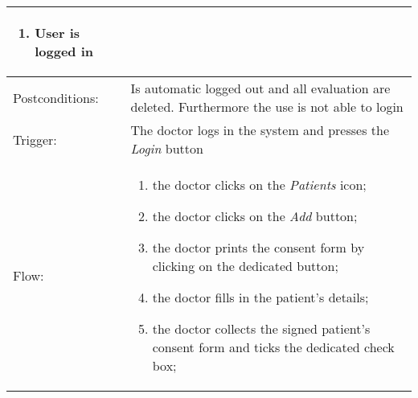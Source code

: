 \begin{longtable}{| p{3.5cm} | p{9cm} |}
\begin{enumerate}
\item User is logged in
\end{enumerate}\\
\hline
Postconditions: & Is automatic logged out and all evaluation are deleted. Furthermore the use is not able to login\\
\hline
Trigger: & The doctor logs in the system and presses the \textit{Login} button\\
\hline
Flow: &\mbox{}\par\vspace{-\baselineskip}
\begin{enumerate}
\item the doctor clicks on the \textit{Patients} icon;
\item the doctor clicks on the \textit{Add} button;
\item the doctor prints the consent form by clicking on the dedicated button;
\item the doctor fills in the patient's details;
\item the doctor collects the signed patient's consent form and ticks the dedicated check box;
\end{enumerate}\\
\hline
\end{longtable}

